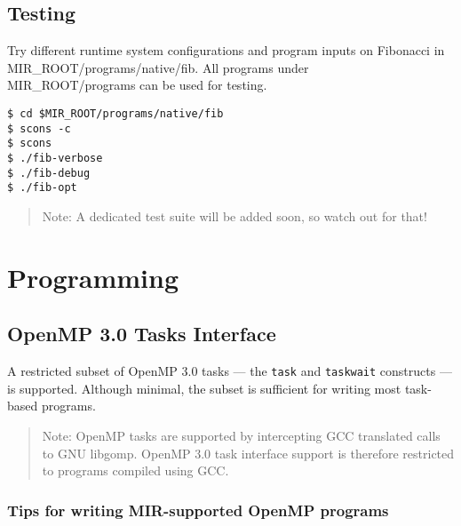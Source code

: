 \documentclass[11pt,a4paper]{article}
\begin{document}
\subsection{Testing}\label{testing}

Try different runtime system configurations and program inputs on Fibonacci in MIR\_ROOT/programs/native/fib. All programs under \\ MIR\_ROOT/programs can be used for testing.

\begin{lstlisting}[style=MyInputStyle]
$ cd $MIR_ROOT/programs/native/fib
$ scons -c
$ scons
$ ./fib-verbose
$ ./fib-debug
$ ./fib-opt
\end{lstlisting}

\begin{framed}
\begin{quote}
Note: A dedicated test suite will be added soon, so watch out for that!
\end{quote}
\end{framed}

\section{Programming}\label{programming}

\subsection{OpenMP 3.0 Tasks Interface}\label{openmp-3.0-tasks-interface}

A restricted subset of OpenMP 3.0 tasks --- the \texttt{task} and \texttt{taskwait} constructs --- is supported. Although minimal, the subset is sufficient for writing most task-based programs.

\begin{framed}
\begin{quote}
Note: OpenMP tasks are supported by intercepting GCC translated calls to GNU libgomp. OpenMP 3.0 task interface support is therefore restricted to programs compiled using GCC.
\end{quote}
\end{framed}

\subsubsection{Tips for writing MIR-supported OpenMP programs}\label{tips-for-writing-mir-supported-openmp-programs}
\end{document}
